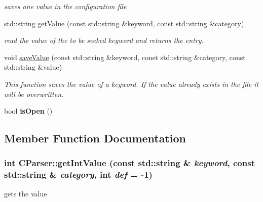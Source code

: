 \begin{DoxyCompactItemize}
\begin{DoxyCompactList}\small\item\em saves one value in the configuration file \item\end{DoxyCompactList}\item 
std::string \hyperlink{class_c_parser_a6f35de18dba3a8f5bf0aa45ca1692161}{getValue} (const std::string \&keyword, const std::string \&category)
\begin{DoxyCompactList}\small\item\em read the value of the to be seeked keyword and returns the entry. \item\end{DoxyCompactList}\item 
void \hyperlink{class_c_parser_ad6f32a86fd00603ffb347587ffbcb76b}{saveValue} (const std::string \&keyword, const std::string \&category, const std::string \&value)
\begin{DoxyCompactList}\small\item\em This function saves the value of a keyword. If the value already exists in the file it will be overwritten. \item\end{DoxyCompactList}\item 
\hypertarget{class_c_parser_aac949490f55c12ab996ee28b7dc4b648}{
bool {\bfseries isOpen} ()}
\label{class_c_parser_aac949490f55c12ab996ee28b7dc4b648}

\end{DoxyCompactItemize}


\subsection{Member Function Documentation}
\hypertarget{class_c_parser_a702bc37d242fade03f3b797417872514}{
\subsubsection[{getIntValue}]{\setlength{\rightskip}{0pt plus 5cm}int CParser::getIntValue (const std::string \& {\em keyword}, \/  const std::string \& {\em category}, \/  int {\em def} = {\ttfamily -\/1})}}
\label{class_c_parser_a702bc37d242fade03f3b797417872514}


gets the value 


